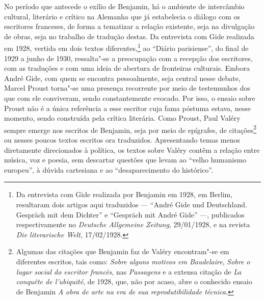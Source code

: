 No período que antecede o exílio de Benjamin, há o ambiente de
intercâmbio cultural, literário e crítico na Alemanha que já estabelecia
o diálogo com os escritores franceses, de forma a tematizar a relação
existente, seja na divulgação de obras, seja no trabalho de tradução
destas. Da entrevista com Gide realizada em 1928, vertida em dois textos
diferentes,\footnote{Da entrevista com Gide realizada por Benjamin em
  1928, em Berlim, resultaram dois artigos aqui traduzidos --- ``André Gide
  und Deutschland. Gespräch mit dem Dichter'' e ``Gespräch mit André
  Gide'' ---, publicados respectivamente no \emph{Deutsche Allgemeine
  Zeitung}, 29/01/1928, e na revista \emph{Die literarische Welt},
  17/02/1928.} ao ``Diário parisiense'', do final de 1929 a junho de 1930, ressalta"-se a preocupação com a recepção dos escritores, com as traduções e com uma
ideia de abertura de fronteiras culturais. Embora André Gide, com quem se encontra
pessoalmente, seja central nesse debate, Marcel Proust torna"-se uma presença
recorrente por meio de testemunhos dos que com ele conviveram, sendo
constantemente evocado. Por isso, o ensaio sobre Proust não é a única
referência a esse escritor cuja fama póstuma estava, nesse momento,
sendo construída pela crítica literária.
Como Proust, Paul Valéry sempre emerge nos escritos de Benjamin, seja
por meio de epígrafes, de citações\footnote{Algumas das citações que Benjamin faz de Valéry encontram"-se em diferentes escritos, tais como: \emph{Sobre alguns motivos em Baudelaire}, \emph{Sobre o lugar social do escritor francês}, nas \emph{Passagens} e a extensa citação de \emph{La conquête de l'ubiquité}, de 1928, que, não por acaso, abre o conhecido ensaio de Benjamin \emph{A obra de arte na era de sua reprodutibilidade técnica}.} ou nesses poucos textos escritos ora
traduzidos. Apresentando temas menos diretamente direcionados à política, os textos sobre Valéry contêm a relação entre música, voz e poesia, sem descartar questões que levam ao ``velho humanismo europeu'', à dúvida cartesiana e ao ``desaparecimento do histórico''.

